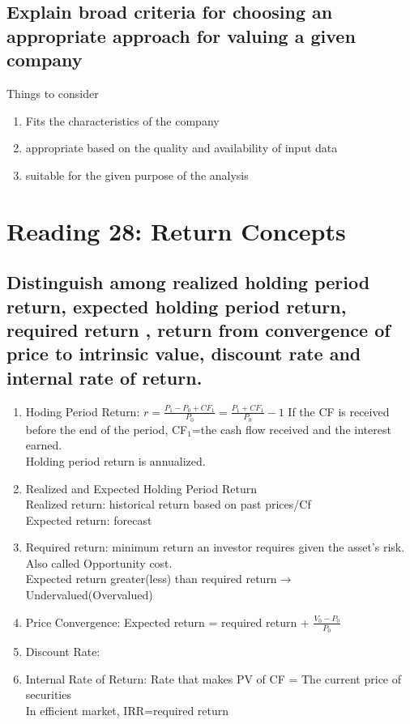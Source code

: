 \documentclass{article}
\newcommand{\be}{\begin{enumerate}}
\newcommand{\ee}{\end{enumerate}}
\newcommand{\ra}{$\rightarrow$}
\begin{document}
\subsection{Explain broad criteria for choosing an appropriate approach for
valuing a given company}
Things to consider
\be
    \item Fits the characteristics of the company
    \item appropriate based on the quality and availability of input data
    \item suitable for the given purpose of the analysis
\ee


\section{Reading 28: Return Concepts}
\subsection{Distinguish among realized holding period return, expected holding period return, required return
, return from convergence of price to intrinsic value, discount rate and internal rate
of return.}
\be
    \item Hoding Period Return: $r=\frac{P_1-P_0+CF_1}{P_0}=\frac{P_1+CF_1}{P_0}-1$
    If the CF is received before the end of the period, CF$_1$=the cash flow received
    and the interest earned.
    \\Holding period return is annualized.
    \item Realized and Expected Holding Period Return
        \\Realized return: historical return based on past prices/Cf
        \\Expected return: forecast
    \item Required return: minimum return an investor requires given the asset's risk. 
        \\Also called Opportunity cost.
        \\ Expected return greater(less) than required return\ra Undervalued(Overvalued)
    \item Price Convergence: Expected return = required return + $\frac{V_0-P_0}{P_0}$
    \item Discount Rate: 
    \item Internal Rate of Return: Rate that makes PV of CF = The current price of securities
        \\In efficient market, IRR=required return
\ee
\end{document}
